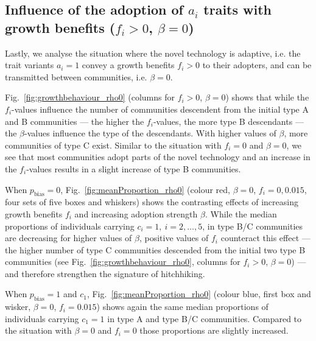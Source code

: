 \documentclass[9pt,twocolumn,twoside,lineno]{pnas-new}
\begin{document}
\subsection*{Influence of the adoption of $a_i$ traits with growth benefits ($f_i>0$, $\beta=0$)}

Lastly, we analyse the situation where the novel technology is adaptive, i.e. the trait variants $a_i=1$ convey a growth benefits $f_i>0$ to their adopters, and can be transmitted between communities, i.e. $\beta=0$. 

Fig.~\ref{fig:growthbehaviour_rho0} (columns for $f_i>0$, $\beta=0$) shows that while the $f_i$-values influence the number of communities descendent from the initial type A and B communities --- the higher the $f_i$-values, the more type B descendants --- the $\beta$-values influence the type of the descendants.
With higher values of $\beta$, more communities of type C exist. Similar to the situation with $f_i=0$ and $\beta=0$, we see that most communities adopt parts of the novel technology and an increase in the $f_i$-values results in a slight increase of type B communities. 

When $p_\text{bias}=0$, Fig.~\ref{fig:meanProportion_rho0} (colour red, $\beta=0$, $f_i=0,0.015$, four sets of five boxes and whiskers) shows the contrasting effects of increasing growth benefits $f_i$ and increasing adoption strength $\beta$.
While the median proportions of individuals carrying $c_i=1,\ i=2,\ldots,5$, in type B/C communities are decreasing for higher values of $\beta$, positive values of $f_i$ counteract this effect --- the higher number of type C communities descended from the initial two type B communities (see Fig.~\ref{fig:growthbehaviour_rho0}, columns for $f_i>0$, $\beta=0$) --- and therefore strengthen the signature of hitchhiking. 

When $p_\text{bias}=1$ and $c_1$, Fig.~\ref{fig:meanProportion_rho0} (colour blue, first box and wisker, $\beta=0$, $f_i=0.015$) shows again the same median proportions of individuals carrying $c_1=1$ in type A and type B/C communities. Compared to the situation with $\beta=0$ and $f_i=0$ those proportions are slightly increased. 
\end{document}
